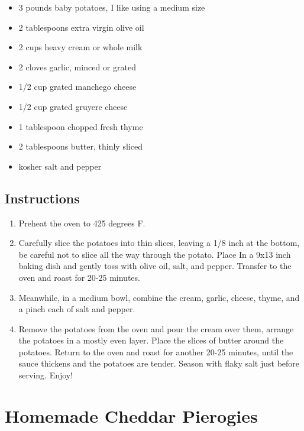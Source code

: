 \documentclass[
  letterpaper,
  DIV=11,
  numbers=noendperiod,
  titlepage=false]{scrreprt}
\providecommand{\tightlist}{%
  \setlength{\itemsep}{0pt}\setlength{\parskip}{0pt}}\usepackage{longtable,booktabs,array}
\begin{document}
\begin{itemize}
\tightlist
\item
  3 pounds baby potatoes, I like using a medium size
\item
  2 tablespoons extra virgin olive oil
\item
  2 cups heavy cream or whole milk
\item
  2 cloves garlic, minced or grated
\item
  1/2 cup grated manchego cheese
\item
  1/2 cup grated gruyere cheese
\item
  1 tablespoon chopped fresh thyme
\item
  2 tablespoons butter, thinly sliced
\item
  kosher salt and pepper
\end{itemize}

\section{Instructions}\label{instructions-37}

\begin{enumerate}
\def\labelenumi{\arabic{enumi}.}
\tightlist
\item
  Preheat the oven to 425 degrees F.
\item
  Carefully slice the potatoes into thin slices, leaving a 1/8 inch at
  the bottom, be careful not to slice all the way through the potato.
  Place In a 9x13 inch baking dish and gently toss with olive oil, salt,
  and pepper. Transfer to the oven and roast for 20-25 minutes.
\item
  Meanwhile, in a medium bowl, combine the cream, garlic, cheese, thyme,
  and a pinch each of salt and pepper.
\item
  Remove the potatoes from the oven and pour the cream over them,
  arrange the potatoes in a mostly even layer. Place the slices of
  butter around the potatoes. Return to the oven and roast for another
  20-25 minutes, until the sauce thickens and the potatoes are tender.
  Season with flaky salt just before serving. Enjoy!
\end{enumerate}


\chapter{Homemade Cheddar Pierogies}\label{homemade-cheddar-pierogies}
\end{document}
